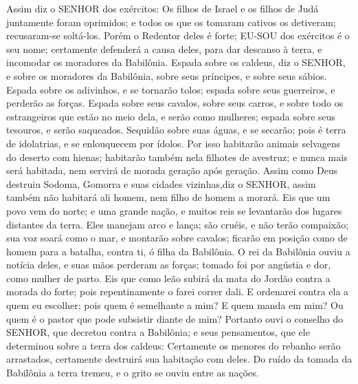 {Assim diz o SENHOR dos exércitos: Os filhos de Israel e os filhos de Judá juntamente foram oprimidos; e todos os que os tomaram cativos os detiveram; recusaram-se soltá-los.
Porém o Redentor deles é forte; EU-SOU dos exércitos é o seu nome; certamente defenderá a causa deles, para dar descanso à terra, e incomodar os moradores da Babilônia.
Espada
{} sobre os caldeus, diz o SENHOR, e sobre os moradores da Babilônia, sobre seus príncipes, e sobre seus sábios.
Espada
{} sobre os adivinhos, e se tornarão tolos; espada
{} sobre seus guerreiros, e perderão as forças.
Espada
{} sobre seus cavalos, sobre seus carros, e sobre todo os estrangeiros
 que estão no meio dela, e serão como mulheres; espada
{} sobre seus tesouros, e serão saqueados.
Sequidão
{} sobre suas águas, e se secarão; pois é terra de idolatrias,
 e se enlouquecem por
{} ídolos.
Por isso
{} habitarão animais selvagens do deserto com hienas; habitarão também nela filhotes de avestruz; e nunca mais será habitada, nem servirá de morada geração após geração.
Assim como Deus destruiu Sodoma, Gomorra e suas cidades vizinhas,diz o SENHOR, assim também não habitará ali homem, nem filho de homem a morará.
Eis que um povo vem do norte; e uma grande nação, e muitos reis se levantarão dos lugares distantes da terra.
Eles manejam arco e lança; são cruéis, e não terão compaixão; sua voz soará como o mar, e montarão sobre cavalos; ficarão em posição como de homem para a batalha, contra ti, ó filha da Babilônia.
O rei da Babilônia ouviu a notícia deles, e suas mãos perderam as forças; tomado foi por angústia e dor, como mulher de parto.
Eis que como leão subirá da mata do Jordão contra a morada do forte; pois repentinamente o farei correr dali. E ordenarei contra ela a quem eu escolher; pois quem é semelhante a mim? E quem manda em mim? Ou quem é o pastor que pode subsistir diante de mim?
Portanto ouvi o conselho do SENHOR, que decretou contra a Babilônia; e seus pensamentos, que ele determinou sobre a terra dos caldeus: Certamente os menores do rebanho serão arrastados, certamente destruirá sua habitação com deles.
Do ruído da tomada da Babilônia a terra tremeu, e o grito se ouviu entre as nações.

\par }


